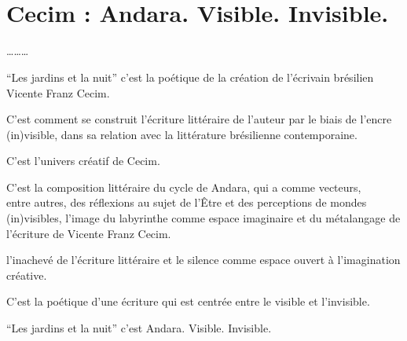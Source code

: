 \chapter*{\\
Cecim : Andara. Visible. Invisible.}

\ldots{}\ldots{}\ldots{}

\bigskip

\normalsize
\noindent{}``Les jardins et la nuit'' c'est la poétique de la création de
l'écrivain brésilien Vicente Franz Cecim.

\noindent{}C'est comment se construit l'écriture littéraire de l'auteur par le
biais de l'encre (in)visible, dans sa relation avec la littérature brésilienne contemporaine.

\noindent{}C'est l'univers créatif de Cecim.

\noindent{}C'est la composition littéraire du cycle de Andara, qui a comme vecteurs,\\
\noindent{}entre autres, des réflexions au sujet de l'Être et des perceptions de mondes\\
\noindent{}(in)visibles, l'image du labyrinthe comme espace imaginaire et du métalangage de l'écriture de Vicente Franz Cecim.

\noindent{}l'inachevé de l'écriture littéraire et le silence comme espace ouvert à l'imagination créative.

\noindent{}C'est la poétique d'une écriture qui est centrée entre le visible et l'invisible.

\noindent{}``Les jardins et la nuit'' c'est Andara. Visible. Invisible.